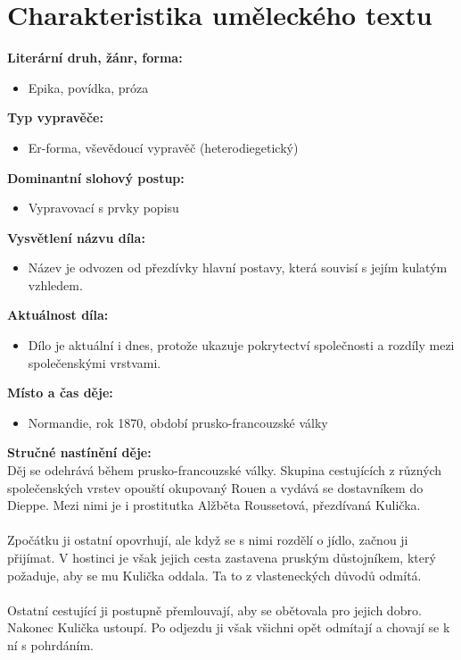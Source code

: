 \documentclass[12pt,a4paper]{article}
\begin{document}
\section*{Charakteristika uměleckého textu}

\begin{tcolorbox}[breakable]

\textbf{Literární druh, žánr, forma:}
\begin{itemize}
\item Epika, povídka, próza
\end{itemize}

\textbf{Typ vypravěče:}
\begin{itemize}
\item Er-forma, vševědoucí vypravěč (heterodiegetický)
\end{itemize}

\textbf{Dominantní slohový postup:}
\begin{itemize}
\item Vypravovací s prvky popisu
\end{itemize}

\textbf{Vysvětlení názvu díla:}
\begin{itemize}
\item Název je odvozen od přezdívky hlavní postavy, která souvisí s jejím kulatým vzhledem.
\end{itemize}

\textbf{Aktuálnost díla:}
\begin{itemize}
\item Dílo je aktuální i dnes, protože ukazuje pokrytectví společnosti a rozdíly mezi společenskými vrstvami.
\end{itemize}

\textbf{Místo a čas děje:}
\begin{itemize}
\item Normandie, rok 1870, období prusko-francouzské války
\end{itemize}

\textbf{Stručné nastínění děje:} \\
Děj se odehrává během prusko-francouzské války. Skupina cestujících z různých společenských vrstev opouští okupovaný Rouen a vydává se dostavníkem do Dieppe. Mezi nimi je i prostitutka Alžběta Roussetová, přezdívaná Kulička.\\
\\
Zpočátku ji ostatní opovrhují, ale když se s nimi rozdělí o jídlo, začnou ji přijímat. V hostinci je však jejich cesta zastavena pruským důstojníkem, který požaduje, aby se mu Kulička oddala. Ta to z vlasteneckých důvodů odmítá.\\
\\
Ostatní cestující ji postupně přemlouvají, aby se obětovala pro jejich dobro. Nakonec Kulička ustoupí. Po odjezdu ji však všichni opět odmítají a chovají se k ní s pohrdáním.\\


\end{tcolorbox}
\end{document}
